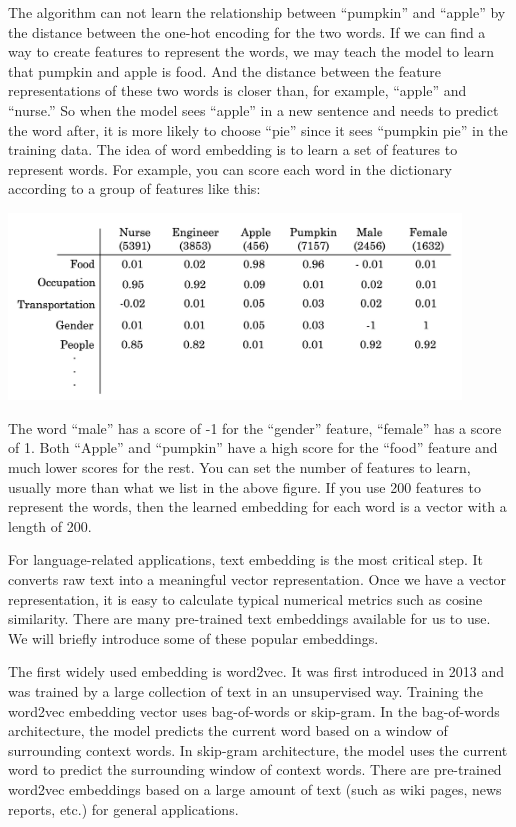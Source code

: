 \documentclass[
  12pt,
]{krantz}
\begin{document}
The algorithm can not learn the relationship between ``pumpkin'' and ``apple'' by the distance between the one-hot encoding for the two words. If we can find a way to create features to represent the words, we may teach the model to learn that pumpkin and apple is food. And the distance between the feature representations of these two words is closer than, for example, ``apple'' and ``nurse.'' So when the model sees ``apple'' in a new sentence and needs to predict the word after, it is more likely to choose ``pie'' since it sees ``pumpkin pie'' in the training data. The idea of word embedding is to learn a set of features to represent words. For example, you can score each word in the dictionary according to a group of features like this:

\includegraphics[width=0.9\textwidth,height=\textheight]{images/rnn_embedding1.png}

The word ``male'' has a score of -1 for the ``gender'' feature, ``female'' has a score of 1. Both ``Apple'' and ``pumpkin'' have a high score for the ``food'' feature and much lower scores for the rest. You can set the number of features to learn, usually more than what we list in the above figure. If you use 200 features to represent the words, then the learned embedding for each word is a vector with a length of 200.

For language-related applications, text embedding is the most critical step. It converts raw text into a meaningful vector representation. Once we have a vector representation, it is easy to calculate typical numerical metrics such as cosine similarity. There are many pre-trained text embeddings available for us to use. We will briefly introduce some of these popular embeddings.

The first widely used embedding is word2vec. It was first introduced in 2013 and was trained by a large collection of text in an unsupervised way. Training the word2vec embedding vector uses bag-of-words or skip-gram. In the bag-of-words architecture, the model predicts the current word based on a window of surrounding context words. In skip-gram architecture, the model uses the current word to predict the surrounding window of context words. There are pre-trained word2vec embeddings based on a large amount of text (such as wiki pages, news reports, etc.) for general applications.
\end{document}
